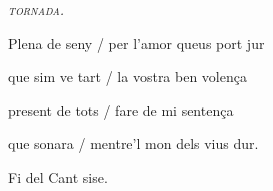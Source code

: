 \documentclass[12pt]{article}
\begin{document}
\begin{estrofaExtra}%




\begin{tornada}

\pagina{[7r]} \textit{\textsc{tornada.}}

\end{tornada}


\end{estrofaExtra}


\begin{estrofa}

 Plena de seny / per l'amor queus port jur

 que sim ve tart / la vostra ben volen\c{c}a

 present de tots / fare de mi senten\c{c}a

 que sonara / mentre'l mon dels vius dur.

\end{estrofa}



\begin{estrofaExtra}%

\begin{final}

Fi del Cant sise.

\end{final}

\end{estrofaExtra}
\end{document}
